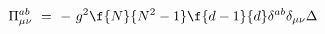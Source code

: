 \begin{equation}\label{5}
\Pi^{ab}_{\mu\nu} ~=~ -~ g^{2}\f{N}{N^{2}-1}\f{d-1}{d}\delta^{ab}
\delta_{\mu\nu}\Delta
\end{equation}

